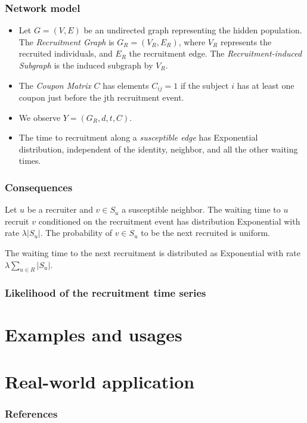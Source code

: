\documentclass{beamer}
\begin{document}
\begin{frame}
\frametitle{Network model}  

\begin{itemize}
  \justifying
  \item Let $G = (V, E)$ be an undirected graph representing the hidden
  population. The {\em Recruitment Graph} is $G_R = (V_R, E_R)$,
  where $V_R$ represents the recruited individuals, and $E_R$ the recruitment
  edge. The {\em Recruitment-induced Subgraph} is the induced subgraph by
  $V_R$. 

  \item The {\em Coupon Matrix} $C$ has elements $C_{ij} = 1$ if the subject
  $i$ has at least one coupon just before the jth recruitment event. 

  \item We observe $Y = (G_R, d, t, C)$. 
  
  \item The time to recruitment along a {\em susceptible edge} has Exponential
  distribution, independent of the identity, neighbor, and all the other
  waiting times.

\end{itemize}

\end{frame}

\begin{frame}
  
  \frametitle{Consequences}

  \begin{theorem}
    Let $u$ be a recruiter and $v \in S_u$ a susceptible neighbor. The waiting
    time to $u$ recruit $v$ conditioned on the recruitment event has
    distribution Exponential with rate $\lambda |S_u|$. The probability of $v
    \in S_u$ to be the next recruited is uniform.  
  \end{theorem}

  \begin{theorem}
    The waiting time to the next recruitment is distributed as Exponential
    with rate $\lambda \sum_{u \in R} |S_u|$.  
  \end{theorem}

\end{frame}

\begin{frame}
  
  \frametitle{Likelihood of the recruitment time series}

\end{frame}
  
\section{Examples and usages}

\section{Real-world application}

\begin{frame}[t, allowframebreaks]
   \frametitle{References}
   
   
 \end{frame}
\end{document}
